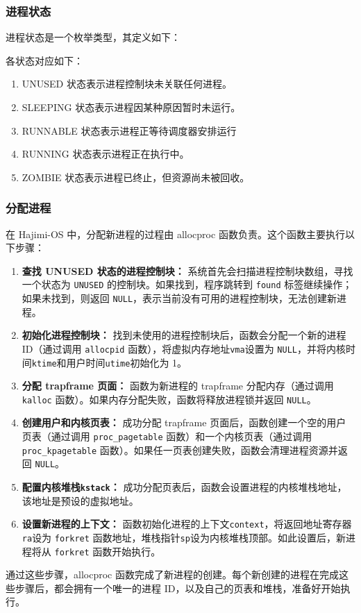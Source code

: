 \documentclass[UTF8]{article}
\begin{document}
      \subsubsection{进程状态}
      进程状态是一个枚举类型，其定义如下：
      
      各状态对应如下：
      \begin{enumerate}
        \item UNUSED 状态表示进程控制块未关联任何进程。
        \item SLEEPING 状态表示进程因某种原因暂时未运行。
        \item RUNNABLE 状态表示进程正等待调度器安排运行
        \item RUNNING 状态表示进程正在执行中。
        \item ZOMBIE 状态表示进程已终止，但资源尚未被回收。
      \end{enumerate}
      \subsubsection{分配进程}
      在 Hajimi-OS 中，分配新进程的过程由 allocproc 函数负责。这个函数主要执行以下步骤：
      \begin{enumerate}[label=\textbf{\arabic*}., wide, labelwidth=!, labelindent=0pt]
        \item \textbf{查找 UNUSED 状态的进程控制块：} 系统首先会扫描进程控制块数组，寻找一个状态为 \texttt{UNUSED} 的控制块。如果找到，程序跳转到 \texttt{found} 标签继续操作；如果未找到，则返回 \texttt{NULL}，表示当前没有可用的进程控制块，无法创建新进程。
        \item \textbf{初始化进程控制块：} 找到未使用的进程控制块后，函数会分配一个新的进程 ID（通过调用 \texttt{allocpid} 函数），将虚拟内存地址\texttt{vma}设置为 \texttt{NULL}，并将内核时间\texttt{ktime}和用户时间\texttt{utime}初始化为 1。
        \item \textbf{分配 trapframe 页面：} 函数为新进程的 trapframe 分配内存（通过调用 \texttt{kalloc} 函数）。如果内存分配失败，函数将释放进程锁并返回 \texttt{NULL}。
        \item \textbf{创建用户和内核页表：} 成功分配 trapframe 页面后，函数创建一个空的用户页表（通过调用 \texttt{proc\_pagetable} 函数）和一个内核页表（通过调用 \texttt{proc\_kpagetable} 函数）。如果任一页表创建失败，函数会清理进程资源并返回 \texttt{NULL}。
        \item \textbf{配置内核堆栈\texttt{kstack}：} 成功分配页表后，函数会设置进程的内核堆栈地址，该地址是预设的虚拟地址。
        \item \textbf{设置新进程的上下文：} 函数初始化进程的上下文\texttt{context}，将返回地址寄存器\texttt{ra}设为 \texttt{forkret} 函数地址，堆栈指针\texttt{sp}设为内核堆栈顶部。如此设置后，新进程将从 \texttt{forkret} 函数开始执行。
      \end{enumerate}
      通过这些步骤，allocproc 函数完成了新进程的创建。每个新创建的进程在完成这些步骤后，都会拥有一个唯一的进程 ID，以及自己的页表和堆栈，准备好开始执行。
\end{document}
